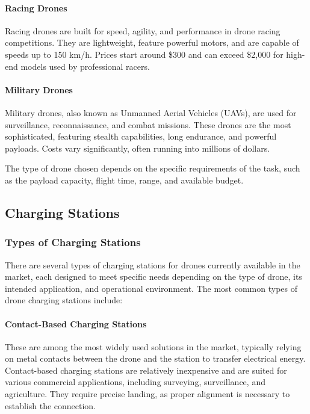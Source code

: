     \paragraph{Racing Drones} Racing drones are built for speed, agility, and performance in drone racing competitions. They are lightweight, feature powerful motors, and are capable of speeds up to 150 km/h. Prices start around \$300 and can exceed \$2,000 for high-end models used by professional racers.
    
    \paragraph{Military Drones} Military drones, also known as Unmanned Aerial Vehicles (UAVs), are used for surveillance, reconnaissance, and combat missions. These drones are the most sophisticated, featuring stealth capabilities, long endurance, and powerful payloads. Costs vary significantly, often running into millions of dollars.
    
    The type of drone chosen depends on the specific requirements of the task, such as the payload capacity, flight time, range, and available budget.

\subsection{Charging Stations}
    \subsubsection{Types of Charging Stations}
    There are several types of charging stations for drones currently available in the market, each designed to meet specific needs depending on the type of drone, its intended application, and operational environment. The most common types of drone charging stations include:
    
    \paragraph{Contact-Based Charging Stations} These are among the most widely used solutions in the market, typically relying on metal contacts between the drone and the station to transfer electrical energy. Contact-based charging stations are relatively inexpensive and are suited for various commercial applications, including surveying, surveillance, and agriculture. They require precise landing, as proper alignment is necessary to establish the connection.
    
